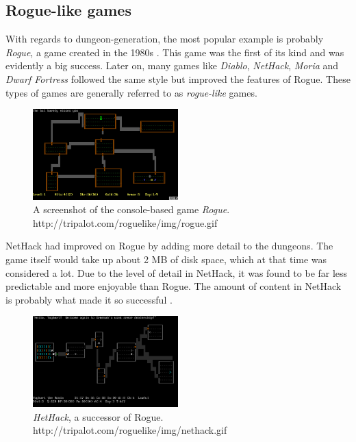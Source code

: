 	\subsection{Rogue-like games}

With regards to dungeon-generation, the most popular example is probably {\em Rogue}, a game created in the 1980s \citep{DBLP:journals/tciaig/AshlockLM11}. This game was the first of its kind and was evidently a big success. Later on, many games like {\em Diablo}, {\em NetHack}, {\em Moria} and {\em Dwarf Fortress} \citep{DBLP:conf/cig/TogeliusPBWHY10} followed the same style but improved the features of Rogue. These types of games are generally referred to as {\em rogue-like} games.
\begin{figure}[h!]
\centering
\includegraphics[width=0.50\textwidth]{images/Rogue0.png}
\caption{A screenshot of the console-based game {\em Rogue}.
\\{\footnotesize http://tripalot.com/roguelike/img/rogue.gif} }
\end{figure}

NetHack had improved on Rogue by adding more detail to the dungeons. The game itself would take up about 2 MB of disk space, which at that time was considered a lot. Due to the level of detail in NetHack, it was found to be far less predictable and more enjoyable than Rogue. The amount of content in NetHack is probably what made it so successful \citep{Roguelike}.
\begin{figure}[h!]
\centering
\includegraphics[width=0.50\textwidth]{images/nethack.png}
\caption{{\em HetHack}, a successor of Rogue.
\\{\footnotesize http://tripalot.com/roguelike/img/nethack.gif} }
\end{figure}

